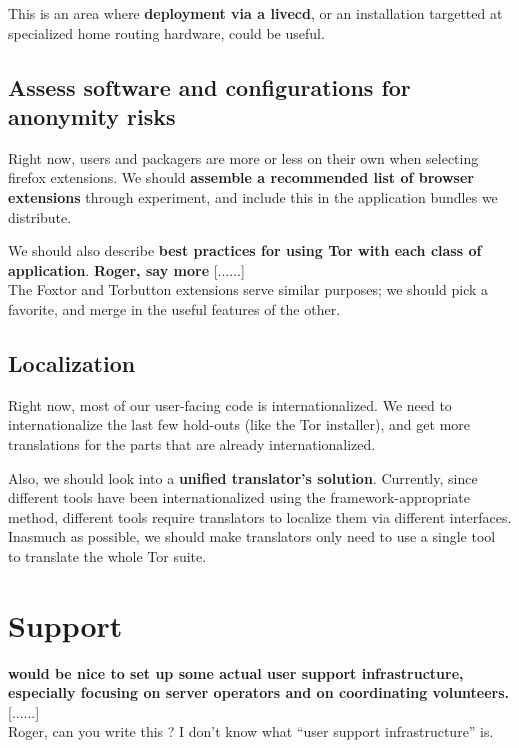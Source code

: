 \documentclass{article}
\newcommand{\tmp}[1]{{\bf #1} [......] \\}
\begin{document}
This is an area where {\bf deployment via a livecd}, or an installation
targetted at specialized home routing hardware, could be useful.

\subsection{Assess software and configurations for anonymity risks}
Right now, users and packagers are more or less on their own when selecting
firefox extensions.  We should {\bf assemble a recommended list of browser
  extensions} through experiment, and include this in the application bundles
we distribute.

We should also describe {\bf best practices for using Tor with each class of
  application}.  \tmp{Roger, say more}

The Foxtor and Torbutton extensions serve similar purposes; we should pick a
favorite, and merge in the useful features of the other.

%

\subsection{Localization}
Right now, most of our user-facing code is internationalized.  We need to
internationalize the last few hold-outs (like the Tor installer), and get
more translations for the parts that are already internationalized.


Also, we should look into a {\bf unified translator's solution}.  Currently,
since different tools have been internationalized using the
framework-appropriate method, different tools require translators to localize
them via different interfaces.  Inasmuch as possible, we should make
translators only need to use a single tool to translate the whole Tor suite.

\section{Support}

\tmp{would be nice to set up some actual user support infrastructure, especially
focusing on server operators and on coordinating volunteers.} Roger, can you
write this ?  I don't know what ``user support infrastructure'' is.
\end{document}
